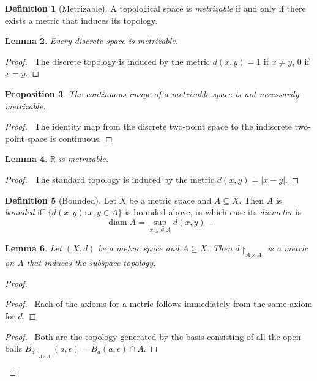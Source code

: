 \documentclass{report}
\let\qed\relax
\newtheorem{lm}{Lemma}[section]
\newtheorem{prop}[lm]{Proposition}
\theoremstyle{definition}
\newtheorem{df}[lm]{Definition}
\newcommand{\diam}{\ensuremath{\operatorname{diam}}}
\begin{document}
  \begin{df}[Metrizable]
    A topological space is \emph{metrizable} if and only if there exists a
    metric that induces its topology.
  \end{df}

  \begin{lm}
    Every discrete space is metrizable.
  \end{lm}

  \begin{proof}
    \pf\ The discrete topology is induced by the metric $d(x, y) = 1$ if $x
    \neq
    y$, 0 if $x = y$. \qed
  \end{proof}

  \begin{prop}
    The continuous image of a metrizable space is not necessarily metrizable.
  \end{prop}

  \begin{proof}
    \pf\ The identity map from the discrete two-point space to the indiscrete two-point space is continuous. \qed
  \end{proof}

  \begin{lm}
    $\mathbb{R}$ is metrizable.
  \end{lm}

  \begin{proof}
    \pf\ The standard topology is induced by the metric $d(x, y) = |x-y|$. \qed
  \end{proof}

  \begin{df}[Bounded]
    Let $X$ be a metric space and $A \subseteq X$. Then $A$ is \emph{bounded}
    iff $\{ d(x, y) : x, y \in A \}$ is bounded above, in which case its
    \emph{diameter} is
    \[ \diam A = \sup_{x, y \in A} d(x, y) \enspace . \]
  \end{df}

  \begin{lm}
    \label{lm:topology:metric:subspace}
    Let $(X, d)$ be a metric space and $A \subseteq X$. Then $d \restriction_{A
      \times A}$ is a metric on $A$ that induces the subspace topology.
  \end{lm}

  \begin{proof}
    \pf
    \begin{proof}
      \pf\ Each of the axioms for a metric follows immediately from the same
      axiom for $d$.
    \end{proof}
    \begin{proof}
      \pf\ Both are the topology generated by the basis consisting of all
      the open balls $B_{d \restriction_{A \times A}}(a, \epsilon) = B_d(a,
      \epsilon)  \cap      A$.
    \end{proof}
    \qed
  \end{proof}
\end{document}
